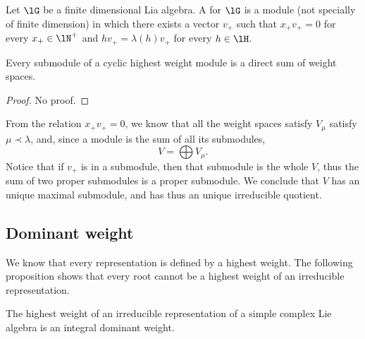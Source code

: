 \begin{definition}
Let $\lG$ be a finite dimensional Lia algebra. A  for $\lG$ is a module (not specially of finite dimension) in which there exists a vector $v_+$ such that $x_+v_+=0$ for every $x_+\in\lN^+$ and $hv_+=\lambda(h)v_+$ for every $h\in\lH$.
\end{definition}

\begin{proposition}
Every submodule of a cyclic highest weight module is a direct sum of weight spaces.
\end{proposition}
\begin{proof}
    No proof.
\end{proof}

From the relation $x_+v_+=0$, we know that all the weight spaces satisfy $V_{\mu}$ satisfy $\mu\prec\lambda$, and, since a module is the sum of all its submodules,
\begin{equation}        \label{EqVsumValpha}
    V=\bigoplus V_{\mu}.
\end{equation}
Notice that if $v_+$ is in a submodule, then that submodule is the whole $V$, thus the sum of two proper submodules is a proper submodule. We conclude that $V$ has an unique maximal submodule, and has thus an unique irreducible quotient.

\subsection{Dominant weight}
\label{SubSecDomiunSei}

We know that every representation is defined by a highest weight. The following proposition shows that every root cannot be a highest weight of an irreducible representation.

\begin{proposition}
    The highest weight of an irreducible representation of a simple complex Lie algebra is an integral dominant weight.
\end{proposition}

